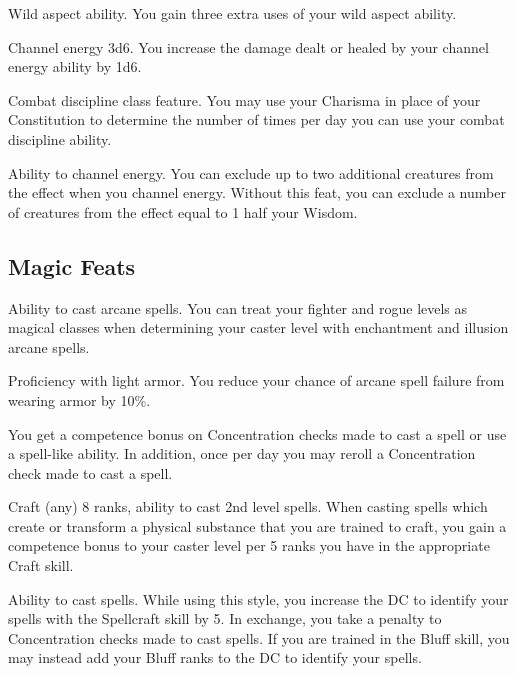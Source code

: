  Wild aspect ability.
 You gain three extra uses of your wild aspect ability.

 Channel energy 3d6.
 You increase the damage dealt or healed by your channel energy ability by 1d6.

\featpre Combat discipline class feature.
\featben You may use your Charisma in place of your Constitution to determine the number of times per day you can use your combat discipline ability. 

 Ability to channel energy.
 You can exclude up to two additional creatures from the effect when you channel energy.
 Without this feat, you can exclude a number of creatures from the effect equal to 1 \add half your Wisdom.

\subsection{Magic Feats}

\featpre Ability to cast arcane spells.
\featben You can treat your fighter and rogue levels as magical classes when determining your caster level with enchantment and illusion arcane spells.

\featpre Proficiency with light armor.
\featben You reduce your chance of arcane spell failure from wearing armor by 10\%. 

 You get a  competence bonus on Concentration checks made to cast a spell or use a spell-like ability. In addition, once per day you may reroll a Concentration check made to cast a spell.

\featpres Craft (any) 8 ranks, ability to cast 2nd level spells.
\featben When casting spells which create or transform a physical substance that you are trained to craft, you gain a  competence bonus to your caster level per 5 ranks you have in the appropriate Craft skill.

\featpre Ability to cast spells.
\featben While using this style, you increase the DC to identify your spells with the Spellcraft skill by 5. In exchange, you take a  penalty to Concentration checks made to cast spells. If you are trained in the Bluff skill, you may instead add your Bluff ranks to the DC to identify your spells.

